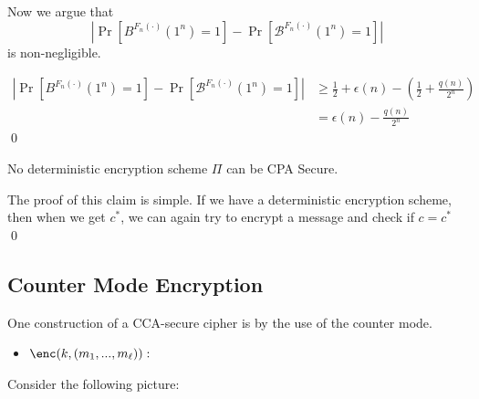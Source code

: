 \documentclass[12pt]{tufte-book}
\newcommand{\mb}{\mathcal{B}}
\newcommand{\getsr}{\xleftarrow{\$}}
\begin{document}
Now we argue that 
$$|\Pr[B^{F_n(\cdot)}(1^n) = 1] - \Pr[\mb^{F_n(\cdot)}(1^n) = 1]|$$
is non-negligible.

\begin{align*}
    |\Pr[B^{F_n(\cdot)}(1^n) = 1] - \Pr[\mb^{F_n(\cdot)}(1^n) = 1]| &\ge \frac{1}{2} + \epsilon(n) - (\frac{1}{2} + \frac{q(n)}{2^n}) \\
    &= \epsilon(n) - \frac{q(n)}{2^n}
\end{align*}
\qed

\begin{theorem}
    No deterministic encryption scheme $\Pi$ can be CPA Secure.
\end{theorem}

\proof
The proof of this claim is simple.
If we have a deterministic encryption scheme, then when we get $c^*$, we can again try to encrypt a message and check if $c = c^*$
\qed


\subsection{Counter Mode Encryption}
One construction of a CCA-secure cipher is by the use of the counter mode.

\begin{itemize}
    \item $\enc(k, (m_1,...,m_\ell)):$
\end{itemize}

Consider the following picture:

\begin{center}
\end{center}
\end{document}
